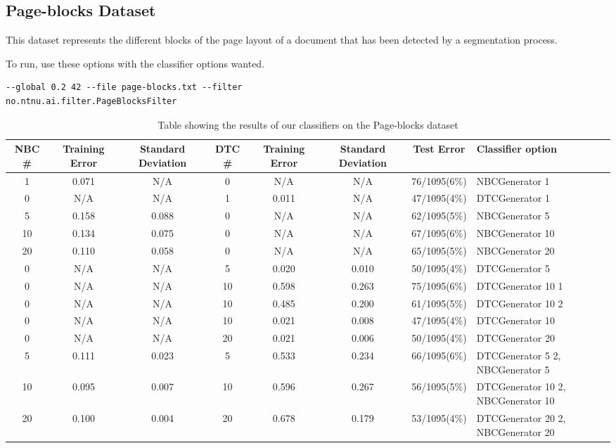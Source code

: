 \subsection{Page-blocks Dataset}\label{pblocks}
This dataset represents the different blocks of the page layout of a document 
that has been detected by a segmentation process.

To run, use these options with the classifier options wanted.

\begin{lstlisting}[label=lst:pblocks, caption=Page-blocks dataset general 
options]
--global 0.2 42 --file page-blocks.txt --filter 
no.ntnu.ai.filter.PageBlocksFilter
\end{lstlisting}

\begin{landscape}
\begin{table}
\begin{tabular}{|c|c|c||c|c|c||c||p{5cm}|}
\hline
NBC \# & Training Error & Standard Deviation & DTC \# & Training Error
& Standard Deviation & Test Error & Classifier option \\ \hline
1 & 0.071 & N/A & 0 & N/A & N/A & 76/1095(6\%) & NBCGenerator 1 \\ \hline
0 & N/A & N/A & 1 & 0.011 & N/A & 47/1095(4\%) & DTCGenerator 1 \\ \hline
5 & 0.158 & 0.088 & 0 & N/A & N/A & 62/1095(5\%) & NBCGenerator 5 \\ \hline
10 & 0.134 & 0.075 & 0 & N/A & N/A & 67/1095(6\%) & NBCGenerator 10 \\ \hline
20 & 0.110 & 0.058 & 0 & N/A & N/A & 65/1095(5\%) & NBCGenerator 20 \\ \hline
0 & N/A & N/A & 5 & 0.020 & 0.010 & 50/1095(4\%) & DTCGenerator 5 \\ \hline
0 & N/A & N/A & 10 & 0.598 & 0.263 & 75/1095(6\%) & DTCGenerator 10 1 \\ \hline
0 & N/A & N/A & 10 & 0.485 & 0.200 & 61/1095(5\%) & DTCGenerator 10 2 \\ \hline
0 & N/A & N/A & 10 & 0.021 & 0.008 & 47/1095(4\%) & DTCGenerator 10 \\ \hline
0 & N/A & N/A & 20 & 0.021 & 0.006 & 50/1095(4\%) & DTCGenerator 20 \\ \hline
5 & 0.111 & 0.023 & 5 & 0.533 & 0.234 & 66/1095(6\%) & DTCGenerator 5 2, 
\newline NBCGenerator 5 \\ \hline
10 & 0.095 & 0.007 & 10 & 0.596 & 0.267 & 56/1095(5\%) & DTCGenerator 10 2, 
\newline NBCGenerator 10 \\ \hline
20 & 0.100 & 0.004 & 20 & 0.678 & 0.179 & 53/1095(4\%) & DTCGenerator 20 2, 
\newline NBCGenerator 20 \\ \hline
\hline
\end{tabular}
\label{tab:pblocks}
\caption[Page-blocks dataset boosting]{Table showing the results of our 
classifiers on the Page-blocks 
dataset}
\end{table}
\end{landscape}


